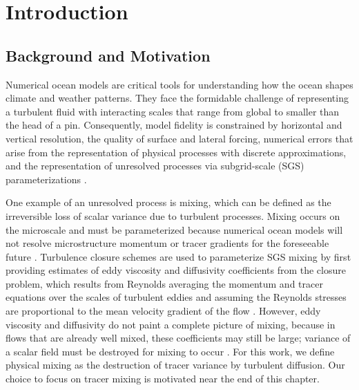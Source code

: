 

\chapter{Introduction}

\section{Background and Motivation}
Numerical ocean models are critical tools for understanding how the ocean shapes climate and weather patterns. They face the formidable challenge of representing a turbulent fluid with interacting scales that range from global to smaller than the head of a pin. Consequently, model fidelity is constrained by horizontal and vertical resolution, the quality of surface and lateral forcing, numerical errors that arise from the representation of physical processes with discrete approximations, and the representation of unresolved processes via subgrid-scale (SGS) parameterizations \citep{fox2019challenges}. 

One example of an unresolved process is mixing, which can be defined as the irreversible loss of scalar variance due to turbulent processes. Mixing occurs on the microscale and must be parameterized because numerical ocean models will not resolve microstructure momentum or tracer gradients for the foreseeable future \citep{fox2014principles, Qu_2022_box}. Turbulence closure schemes are used to parameterize SGS mixing by first providing estimates of eddy viscosity and diffusivity coefficients from the closure problem, which results from Reynolds averaging the momentum and tracer equations over the scales of turbulent eddies and assuming the Reynolds stresses are proportional to the mean velocity gradient of the flow \citep{pope2001turbulent}. However, eddy viscosity and diffusivity do not paint a complete picture of mixing, because in flows that are already well mixed, these coefficients may still be large; variance of a scalar field must be destroyed for mixing to occur \citep{Burchard_2008, MacCready_2018, osborn1972oceanic}. For this work, we define physical mixing as the destruction of tracer variance by turbulent diffusion. Our choice to focus on tracer mixing is motivated near the end of this chapter.

